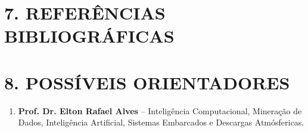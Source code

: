 \documentclass[12pt, a4paper]{article}
\begin{document}
\section*{7. REFERÊNCIAS BIBLIOGRÁFICAS}

\renewcommand{\refname}{} %


\section*{8. POSSÍVEIS ORIENTADORES}

\begin{enumerate}
    \item \textbf{Prof. Dr. Elton Rafael Alves} -- Inteligência
    Computacional, Mineração de Dados, Inteligência Artificial,
    Sistemas Embarcados e Descargas Atmósfericas.
    
\end{enumerate}

\vspace{1cm}
\end{document}
